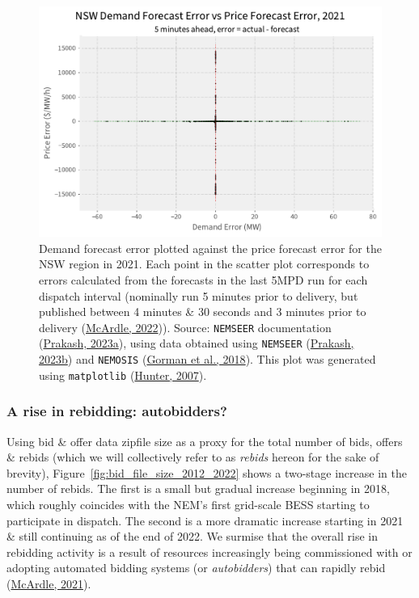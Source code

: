 \documentclass[12pt,a4paper,]{report}
\begin{document}
\begin{figure}
\hypertarget{fig:nsw_5min_price_demand_errors_2021}{%
\centering
\includegraphics{source/figures/NSW_demand_price_forecast_errors_300ahead_2021.pdf}
\caption{Demand forecast error plotted against the price forecast error
for the NSW region in 2021. Each point in the scatter plot corresponds
to errors calculated from the forecasts in the last 5MPD run for each
dispatch interval (nominally run 5 minutes prior to delivery, but
published between 4 minutes \& 30 seconds and 3 minutes prior to
delivery (\protect\hyperlink{ref-mcardleFileCreationTimes2022}{McArdle,
2022})). Source: \texttt{NEMSEER} documentation
(\protect\hyperlink{ref-prakashEnergyPriceConvergence2023}{Prakash,
2023a}), using data obtained using \texttt{NEMSEER}
(\protect\hyperlink{ref-prakashNEMSEER2023}{Prakash, 2023b}) and
\texttt{NEMOSIS}
(\protect\hyperlink{ref-gormanNEMOSISNEMOpen2018}{Gorman et al., 2018}).
This plot was generated using \texttt{matplotlib}
(\protect\hyperlink{ref-hunterMatplotlib2DGraphics2007}{Hunter,
2007}).}\label{fig:nsw_5min_price_demand_errors_2021}
}
\end{figure}

\hypertarget{sec:info-case_study-price_forecast_errors-bidding_analysis}{%
\subsubsection{A rise in rebidding:
autobidders?}\label{sec:info-case_study-price_forecast_errors-bidding_analysis}}

Using bid \& offer data zipfile size as a proxy for the total number of
bids, offers \& rebids (which we will collectively refer to as
\emph{rebids} hereon for the sake of brevity),
Figure~\ref{fig:bid_file_size_2012_2022} shows a two-stage increase in
the number of rebids. The first is a small but gradual increase
beginning in 2018, which roughly coincides with the NEM's first
grid-scale BESS starting to participate in dispatch. The second is a
more dramatic increase starting in 2021 \& still continuing as of the
end of 2022. We surmise that the overall rise in rebidding activity is a
result of resources increasingly being commissioned with or adopting
automated bidding systems (or \emph{autobidders}) that can rapidly rebid
(\protect\hyperlink{ref-mcardleRiseAutobidder2021}{McArdle, 2021}).
\end{document}
